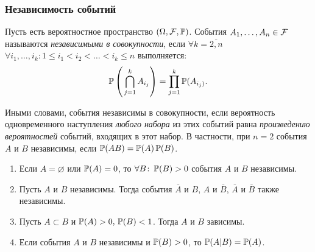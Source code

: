 \subsubsection{Независимость событий}
\begin{defn}
	Пусть есть вероятностное пространство $(\Omega, \mathcal{F}, \operatorname{\mathbb{P}})$. 
	События $A_1, \ldots, A_n \in \mathcal{F}$ называются \textit{независимыми в совокупности}, если 
	$\forall k = \overline{2, n}$ $\forall i_{1}, \ldots, i_{k} \colon 1 \leqslant i_1 < i_2 < \ldots < i_k \leqslant n$ выполняется:
	\begin{equation*}
		\operatorname{\mathbb{P}}\left(\, \bigcap\limits_{j=1}^k A_{i_j}\right) = \prod\limits_{j=1}^k \operatorname{\mathbb{P}}(A_{i_j)}.
	\end{equation*}
	
	Иными словами, события независимы в совокупности, если вероятность одновременного наступления \textit{любого набора} из этих событий равна \textit{произведению вероятностей} событий, входящих в этот набор. 
	В частности, при $n = 2$ события $A$ и $B$ независимы, если $\operatorname{\mathbb{P}}(AB) = \operatorname{\mathbb{P}}(A)\operatorname{\mathbb{P}}(B)$.
\end{defn}

\begin{namedthm}\leavevmode
	\begin{enumerate}
		\item 
		      Если $A = \varnothing$ или $\operatorname{\mathbb{P}}(A) = 0$, то $\forall B \colon \operatorname{\mathbb{P}}(B) > 0$ события $A$ и $B$ независимы.
		\item 
		      Пусть $A$ и $B$ независимы. Тогда события $\overline{A}$ и $B$, $A$ и $\overline{B}$, $\overline{A}$ и $\overline{B}$ также независимы. 
		\item 
		      Пусть $A \subset B$ и $\operatorname{\mathbb{P}}(A) > 0, \, \operatorname{\mathbb{P}}(B) < 1$. Тогда $A$ и $B$ зависимы. 
		\item 
		      Если события $A$ и $B$ независимы и $\operatorname{\mathbb{P}}(B) > 0$, то $\operatorname{\mathbb{P}}(A|B) = \operatorname{\mathbb{P}}(A)$.
	\end{enumerate}
\end{namedthm}

